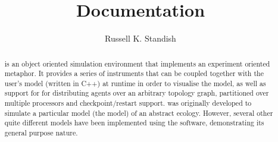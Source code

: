 \title{\EcoLab{} Documentation}
\author{Russell K. Standish}
\newcommand{\br}{\mbox{${\bf r}$}} %
\newcommand{\bbeta}{\mbox{\boldmath{$\beta$}}}   %
\newcommand{\bgamma}{\mbox{\boldmath{$\gamma$}}} %
\newcommand{\bmu}{\mbox{\boldmath{$\mu$}}}       %
\newcommand{\bn}{\mbox{\boldmath{$n$}}}          %
\newcommand{\nsp}{\mbox{$n_{\rm sp}$}}           %

\newcommand{\EcoLab}{{\sffamily\slshape
    \mbox{\raisebox{.5ex}{Eco}\hspace{-.4em}{\makebox[.5em]{L}ab}}}}

\newcommand{\psection}[1]{\subsection{#1}}
\newcommand{\psubsection}[1]{\subsubsection{#1}}

\renewcommand{\htmladdnormallinkfoot}[2]{#1\footnote{#2}}

\makeindex


\maketitle
\begin{abstract}
  \EcoLab{} is an object oriented simulation environment that
  implements an experiment oriented metaphor. It provides a series of
  instruments that can be coupled together with the user's model
  (written in C++) at runtime in order to visualise the model, as well
  as support for for distributing agents over an arbitrary topology
  graph, partitioned over multiple processors and checkpoint/restart
  support. \EcoLab{} was originally developed to simulate a particular
  model (the \EcoLab{} model) of an abstract
  ecology\cite{Standish94}. However, several other quite different
  models have been implemented using the software, demonstrating its
  general purpose nature.
\end{abstract}

\tableofcontents
















\printindex

